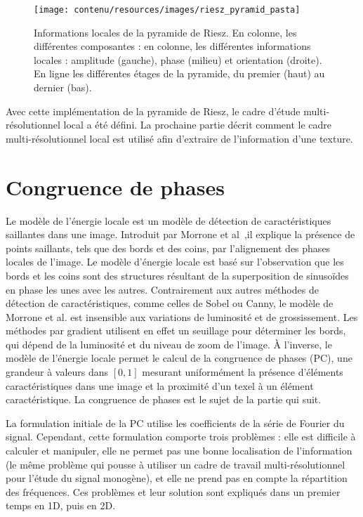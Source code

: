 \begin{figure}[hp]
    \centering
    \texttt{[image: contenu/resources/images/riesz\_pyramid\_pasta]}
    \caption[Informations locales de la pyramide de Riesz]{Informations locales de la pyramide de Riesz. En colonne, les différentes composantes : en colonne, les différentes informations locales : amplitude (gauche), phase (milieu) et orientation (droite). En ligne les différentes étages de la pyramide, du premier (haut) au dernier (bas).}
    \label{fig:riesz-pyramid-local}
\end{figure}

Avec cette implémentation de la pyramide de Riesz, le cadre d'étude multi-résolutionnel local a été défini. La prochaine partie décrit comment le cadre multi-résolutionnel local est utilisé afin d'extraire de l'information d'une texture.

\section{Congruence de phases}

Le modèle de l'énergie locale est un modèle de détection de caractéristiques saillantes dans une image. Introduit par Morrone et al~\cite{morrone_mach_1986, morrone_feature_1987},il explique la présence de points saillants, tels que des bords et des coins, par l'alignement des phases locales de l'image. Le modèle d'énergie locale est basé sur l'observation que les bords et les coins sont des structures résultant de la superposition de sinusoïdes en phase les unes avec les autres. Contrairement aux autres méthodes de détection de caractéristiques, comme celles de Sobel ou Canny, le modèle de Morrone et al. est insensible aux variations de luminosité et de grossissement. Les méthodes par gradient utilisent en effet un seuillage pour déterminer les bords, qui dépend de la luminosité et du niveau de zoom de l'image. À l'inverse, le modèle de l'énergie locale permet le calcul de la \og congruence de phases \fg (PC), une grandeur à valeurs dans $[0, 1]$ mesurant uniformément la présence d'éléments caractéristiques dans une image et la proximité d'un texel à un élément caractéristique. La congruence de phases est le sujet de la partie qui suit.

\bigskip

La formulation initiale de la PC utilise les coefficients de la série de Fourier du signal. Cependant, cette formulation comporte trois problèmes : elle est difficile à calculer et manipuler, elle ne permet pas une bonne localisation de l'information (le même problème qui pousse à utiliser un cadre de travail multi-résolutionnel pour l'étude du signal monogène), et elle ne prend pas en compte la répartition des fréquences. Ces problèmes et leur solution sont expliqués dans un premier temps en 1D, puis en 2D.

